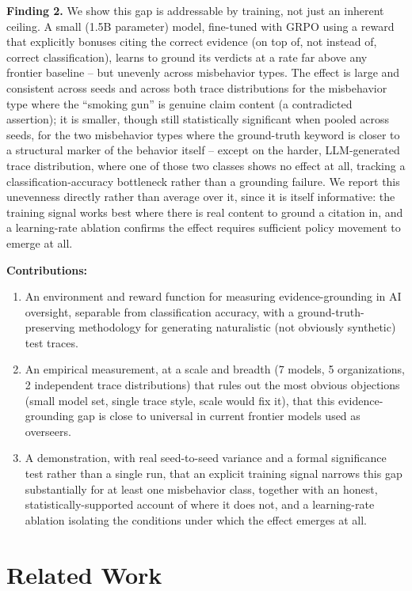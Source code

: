 \documentclass[conference]{IEEEtran}
\begin{document}
\textbf{Finding 2.} We show this gap is addressable by training, not just an
inherent ceiling. A small (1.5B parameter) model, fine-tuned with GRPO using
a reward that explicitly bonuses citing the correct evidence (on top of, not
instead of, correct classification), learns to ground its verdicts at a rate
far above any frontier baseline -- but unevenly across misbehavior types.
The effect is large and consistent across seeds and across both trace
distributions for the misbehavior type where the ``smoking gun'' is genuine
claim content (a contradicted assertion); it is smaller, though still
statistically significant when pooled across seeds, for the two misbehavior
types where the ground-truth keyword is closer to a structural marker of the
behavior itself -- except on the harder, LLM-generated trace distribution,
where one of those two classes shows no effect at all, tracking a
classification-accuracy bottleneck rather than a grounding failure. We
report this unevenness directly rather than average over it, since it is
itself informative: the training signal works best where there is real
content to ground a citation in, and a learning-rate ablation confirms the
effect requires sufficient policy movement to emerge at all.

\textbf{Contributions:}
\begin{enumerate}
  \item An environment and reward function for measuring evidence-grounding
    in AI oversight, separable from classification accuracy, with a
    ground-truth-preserving methodology for generating naturalistic (not
    obviously synthetic) test traces.
  \item An empirical measurement, at a scale and breadth (7 models, 5
    organizations, 2 independent trace distributions) that rules out the most
    obvious objections (small model set, single trace style, scale would fix
    it), that this evidence-grounding gap is close to universal in current
    frontier models used as overseers.
  \item A demonstration, with real seed-to-seed variance and a formal
    significance test rather than a single run, that an explicit training
    signal narrows this gap substantially for at least one misbehavior
    class, together with an honest, statistically-supported account of
    where it does not, and a learning-rate ablation isolating the
    conditions under which the effect emerges at all.
\end{enumerate}

\section{Related Work}
\label{sec:related-work}
\end{document}
